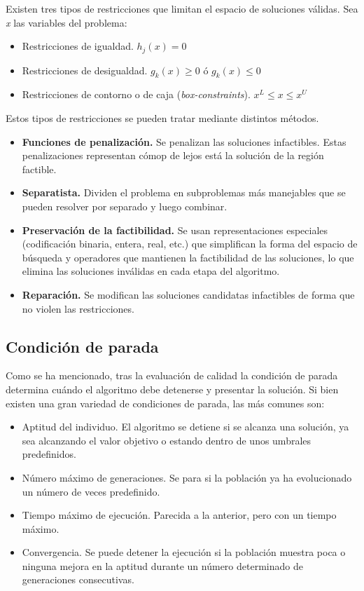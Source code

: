 Existen tres tipos de restricciones que limitan el espacio de soluciones válidas. Sea \textit{x} las variables del problema:

\begin{itemize}
  \item Restricciones de igualdad. $h_j(x) = 0$
  \item Restricciones de desigualdad. $g_k(x) \geq 0$ ó $g_k(x) \leq 0$
  \item Restricciones de contorno o de caja (\textit{box-constraints}). $x^L \leq x \leq x^U$
\end{itemize}

Estos tipos de restricciones se pueden tratar mediante distintos métodos.

\begin{itemize}
  \item \textbf{Funciones de penalización.} Se penalizan las soluciones infactibles. Estas penalizaciones representan cómop de lejos está la solución de la región factible.
  \item \textbf{Separatista.} Dividen el problema en subproblemas más manejables que se pueden resolver por separado y luego combinar.
  \item \textbf{Preservación de la factibilidad.} Se usan representaciones especiales (codificación binaria, entera, real, etc.) que simplifican la forma del espacio de búsqueda y operadores que mantienen la factibilidad de las soluciones, lo que elimina las soluciones inválidas en cada etapa del algoritmo.
  \item \textbf{Reparación.} Se modifican las soluciones candidatas infactibles de forma que no violen las restricciones.
\end{itemize}

\subsection{Condición de parada}

Como se ha mencionado, tras la evaluación de calidad la condición de parada determina cuándo el algoritmo debe detenerse y presentar la solución. Si bien existen una gran variedad de condiciones de parada, las más comunes son:

\begin{itemize}
  \item Aptitud del individuo. El algoritmo se detiene si se alcanza una solución, ya sea alcanzando el valor objetivo o estando dentro de unos umbrales predefinidos.
  \item Número máximo de generaciones. Se para si la población ya ha evolucionado un número de veces predefinido.
  \item Tiempo máximo de ejecución. Parecida a la anterior, pero con un tiempo máximo.
  \item Convergencia. Se puede detener la ejecución si la población muestra poca o ninguna mejora en la aptitud durante un número determinado de generaciones consecutivas.
\end{itemize}

